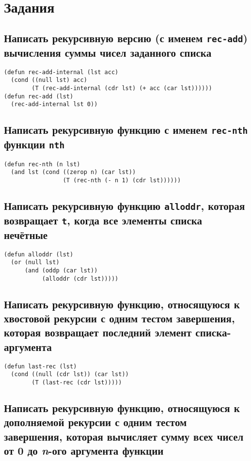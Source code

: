 \chapter{Задания}

\section{Написать рекурсивную версию (с именем \texttt{rec-add}) вычисления суммы чисел заданного списка}

\begin{lstlisting}
(defun rec-add-internal (lst acc)
  (cond ((null lst) acc)
        (T (rec-add-internal (cdr lst) (+ acc (car lst))))))
(defun rec-add (lst)
  (rec-add-internal lst 0))
\end{lstlisting}

\section{Написать рекурсивную функцию с именем \texttt{rec-nth} функции \texttt{nth}}

\begin{lstlisting}
(defun rec-nth (n lst)
  (and lst (cond ((zerop n) (car lst))
                 (T (rec-nth (- n 1) (cdr lst))))))
\end{lstlisting}

\section{Написать рекурсивную функцию \texttt{alloddr}, которая возвращает \texttt{t}, когда все элементы списка нечётные}

\begin{lstlisting}
(defun alloddr (lst)
  (or (null lst) 
      (and (oddp (car lst))
           (alloddr (cdr lst)))))
\end{lstlisting}

\section{Написать рекурсивную функцию, относящуюся к хвостовой рекурсии с одним тестом завершения, которая возвращает последний элемент списка-аргумента}

\begin{lstlisting}
(defun last-rec (lst)
  (cond ((null (cdr lst)) (car lst))
        (T (last-rec (cdr lst)))))
\end{lstlisting}

\section{Написать рекурсивную функцию, относящуюся к дополняемой рекурсии с одним тестом завершения, которая вычисляет сумму всех чисел от 0 до \textit{n}-ого аргумента функции}

